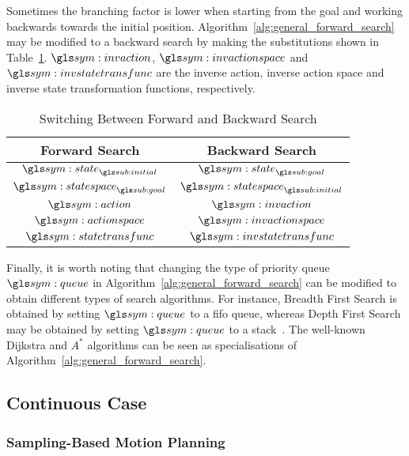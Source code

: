 		Sometimes the branching factor is lower when starting from the goal and
		working backwards towards the initial position.
		Algorithm~\ref{alg:general_forward_search} may be modified to a backward
		search by making the substitutions shown in
		Table~\ref{tab:switiching_between_forward_and_backward_search}.
		$\invaction$, $\invactionspace$ and $\invstatetransfunc$ are the inverse
		action, inverse action space and inverse state transformation functions,
		respectively.

		\begin{table}[ht]
			\centering
			\begin{tabular}{c  c}
				\toprule
				Forward Search 			& Backward Search\\
				\midrule
				$\state_{\initial}$		&	$\state_{\goal}$ 			\\
				$\statespace_{\goal}$	&	$\statespace_{\initial}$	\\
				$\action$ 				&	$\invaction$				\\
				$\actionspace$ 			&	$\invactionspace$			\\
				$\statetransfunc$ 		&	$\invstatetransfunc$		\\
			\end{tabular}
			\caption{Switching Between Forward and Backward Search}%
			\label{tab:switiching_between_forward_and_backward_search}
		\end{table}


		Finally, it is worth noting that changing the type of priority queue
		$\queue$ in Algorithm~\ref{alg:general_forward_search} can be modified
		to obtain different types of search algorithms. For instance, Breadth
		First Search is obtained by setting $\queue$ to a \gls{fifo} queue,
		whereas Depth First Search may be obtained by setting $\queue$ to a
		stack~\cite[][page 35]{bib:planning:planning_algorithms}. The well-known
		Dijkstra and $A^*$ algorithms can be seen as specialisations of
		Algorithm~\ref{alg:general_forward_search}.

	\subsection{Continuous Case}%
	\label{sec:continuous_case}

		\subsubsection{Sampling-Based Motion Planning}%
		\label{sec:sampling_based_motion_planning}

